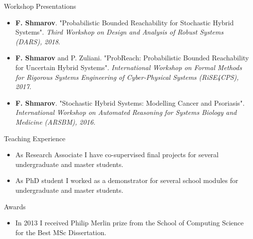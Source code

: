\documentclass{resume} %
\begin{document}
\begin{rSection}{Workshop Presentations}
\begin{itemize}

	\item {\bf F. Shmarov}. "Probabilistic Bounded Reachability for Stochastic Hybrid Systems". 
	{\em Third Workshop on Design and Analysis of Robust Systems (DARS), 2018}.

	\item {\bf F. Shmarov} and P. Zuliani. "ProbReach: Probabilistic Bounded 
	Reachability for Uncertain Hybrid Systems". {\em International Workshop on
	Formal Methods for Rigorous Systems Engineering of Cyber-Physical Systems (RiSE4CPS), 2017}.

	\item {\bf F. Shmarov}. "Stochastic Hybrid Systems: Modelling Cancer and Psoriasis". 
	{\em International Workshop on Automated Reasoning for Systems Biology and Medicine (ARSBM), 2016.}

\end{itemize}	
\end{rSection}



\begin{rSection}{Teaching Experience}
\begin{itemize}
	\item As Research Associate I have co-supervised final projects for
	several undergraduate and master students.

	\item As PhD student I worked as a demonstrator for several
	school modules for undergraduate and master students.
\end{itemize}
\end{rSection}



\begin{rSection}{Awards}
\begin{itemize}
	\item In 2013 I received Philip Merlin prize from the School of Computing Science 
	for the Best MSc Dissertation.
\end{itemize}
\end{rSection}
\end{document}
